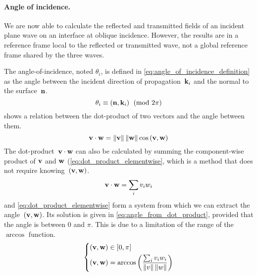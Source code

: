 \paragraph{Angle of incidence.}
We are now able to calculate the reflected and transmitted fields of an incident plane wave on an interface at oblique incidence.
However, the results are in a reference frame local to the reflected or transmitted wave, not a global reference frame shared by the three waves.

The angle-of-incidence, noted $\theta_i$, is defined in \cref{eq:angle_of_incidence_definition} as the angle between the incident direction of propagation~$\textbf{k}_i$ and the normal to the surface~$\textbf{n}$.
\begin{equation}
    \theta_i \equiv \left(\textbf{n}, \textbf{k}_i\right) \pmod{2\pi}
    \label{eq:angle_of_incidence_definition}
\end{equation}
 shows a relation between the dot-product of two vectors and the angle between them.
\begin{equation}
    \textbf{v} \cdot \textbf{w} = \left\| \textbf{v} \right\| \left\| \textbf{w} \right\| \cos \left(\textbf{v}, \textbf{w}\right)
    \label{eq:dot_product_cos}
\end{equation}
The dot-product~$\textbf{v} \cdot \textbf{w}$ can also be calculated by summing the component-wise product of $\textbf{v}$ and $\textbf{w}$ (\cref{eq:dot_product_elementwise}, which is a method that does not require knowing~$\left(\textbf{v}, \textbf{w}\right)$.
\begin{equation}
    \textbf{v} \cdot \textbf{w} = \sum_i v_i w_i
    \label{eq:dot_product_elementwise}
\end{equation}
 and \cref{eq:dot_product_elementwise} form a system from which we can extract the angle~$\left(\textbf{v}, \textbf{w}\right)$.
Its solution is given in \cref{eq:angle_from_dot_product}, provided that the angle is between 0 and $\pi$.
This is due to a limitation of the range of the $\arccos$ function.
\begin{equation}
    \left\lbrace
        \begin{aligned}
            \left(\textbf{v}, \textbf{w}\right) &\in [0, \pi]
            \\
            \left(\textbf{v}, \textbf{w}\right) &= \arccos
            \left(
                \frac{
                    \sum_i v_i w_i
                }{
                    \left\| v \right\| \left\| w \right\|
                }
            \right)
        \end{aligned}
    \right.
    \label{eq:angle_from_dot_product}
\end{equation}
